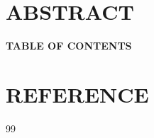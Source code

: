 \documentclass[12pt,a4paper]{article}
\begin{document}

\setcounter{page}{2}

\section*{ABSTRACT}

\newpage

\begin{center}{\large\bfseries TABLE OF CONTENTS}\end{center}
\vspace{-0.8cm}
\tableofcontents

\newpage


\newpage
\section*{REFERENCE}
\begin{thebibliography}{99}
\setlength{\itemsep}{3pt}
\end{thebibliography}
\end{document}
